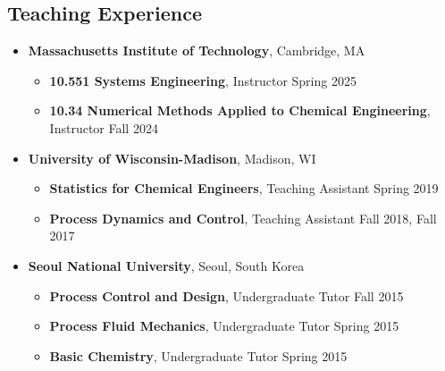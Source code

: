 \subsection*{Teaching Experience}
\begin{itemize}[itemsep=1pt, parsep=0pt,leftmargin=*]
\item[] \textbf{Massachusetts Institute of Technology}, Cambridge, MA
  \begin{itemize}[leftmargin=*,itemsep=0pt]
  \item[] \textbf{10.551 Systems Engineering}, Instructor \hfill Spring 2025
  \item[] \textbf{10.34 Numerical Methods Applied to Chemical Engineering}, Instructor \hfill Fall 2024
  \end{itemize}
\item[] \textbf{University of Wisconsin-Madison}, Madison, WI
  \begin{itemize}[leftmargin=*,itemsep=0pt]
  \item[] \textbf{Statistics for Chemical Engineers}, Teaching Assistant \hfill Spring 2019
  \item[] \textbf{Process Dynamics and Control}, Teaching Assistant \hfill  Fall 2018, Fall 2017
  \end{itemize}
\item[] \textbf{Seoul National University}, Seoul, South Korea
  \begin{itemize}[leftmargin=*,itemsep=0pt]
  \item[] \textbf{Process Control and Design}, Undergraduate Tutor \hfill  Fall 2015
  \item[] \textbf{Process Fluid Mechanics}, Undergraduate Tutor \hfill Spring 2015
  \item[] \textbf{Basic Chemistry}, Undergraduate Tutor \hfill Spring 2015
  \end{itemize}
\end{itemize}
